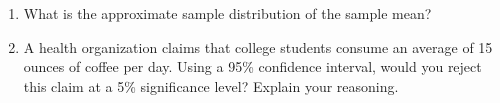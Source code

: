 \documentclass[12pt]{article}
\begin{document}
\medskip
\begin{enumerate}[label=(\alph*)]
  \item What is the approximate sample distribution of the sample mean?

  \item A health organization claims that college students consume an average of 15 ounces of coffee per day.
  Using a 95\% confidence interval, would you reject this claim at a 5\% significance level? 
  Explain your reasoning.
\end{enumerate}
\end{document}
